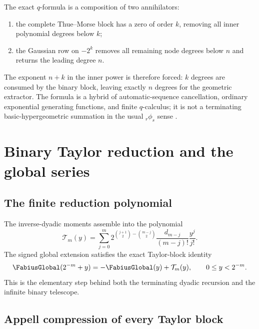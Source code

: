 \documentclass[11pt,oneside]{article}
\theoremstyle{definition}
\theoremstyle{remark}
\begin{document}
The exact $q$-formula is a composition of two annihilators:
\begin{enumerate}
\item the complete Thue--Morse block has a zero of order $k$, removing all inner polynomial
      degrees below $k$;
\item the Gaussian row on $-2^k$ removes all remaining node degrees below $n$ and returns the
      leading degree $n$.
\end{enumerate}
The exponent $n+k$ in the inner power is therefore forced: $k$ degrees are consumed by the
binary block, leaving exactly $n$ degrees for the geometric extractor.  The formula is a
hybrid of automatic-sequence cancellation, ordinary exponential generating functions, and
finite $q$-calculus; it is not a terminating basic-hypergeometric summation in the usual
${}_r\phi_s$ sense \cite{dyadicweb:gasper2004,dyadicweb:dlmf17}.

\section{Binary Taylor reduction and the global series}
\label{dyadicweb:sec:binary}

\subsection{The finite reduction polynomial}

The inverse-dyadic moments assemble into the polynomial
\begin{equation}
 \mathcal T_m(y)=
 \sum_{j=0}^{m}
 2^{\binom{j+1}{2}-\binom{m-j}{2}}
 \frac{d_{m-j}}{(m-j)!}\frac{y^j}{j!}.                    \label{dyadicweb:eq:T-def-local}
\end{equation}
The signed global extension satisfies the exact Taylor-block identity
\begin{equation}
 \FabiusGlobal(2^{-m}+y)=-\FabiusGlobal(y)+\mathcal T_m(y),
 \qquad 0\le y<2^{-m}.                                    \label{dyadicweb:eq:T-reduction-local}
\end{equation}
This is the elementary step behind both the terminating dyadic recursion and the infinite
binary telescope.

\subsection{Appell compression of every Taylor block}
\end{document}
